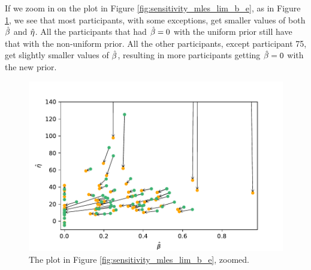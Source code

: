 If we zoom in on the plot in Figure \ref{fig:sensitivity_mles_lim_b_e}, as in Figure \ref{fig:sensitivity_mles_lim_b_e_zoomed}, we see that most participants, with some exceptions, get smaller values of both $\hat{\beta}$ and $\hat{\eta}$. 
All the participants that had $\hat{\beta}=0$ with the uniform prior still have that with the non-uniform prior. %
All the other participants, except participant 75, get slightly smaller values of $\hat{\beta}$, resulting in more participants getting $\hat{\beta}=0$ with the new prior.
\begin{figure}
    \centering
    \includegraphics[scale=0.7]{pictures/Sensitivity/mles_lim_b_e_zoomed.pdf}
    \caption[MLEs of $\beta$ and $\eta$ for prior with $\gamma=\kappa=1$ and $\gamma=\kappa=0.5$, limited, zoomed]{The plot in Figure \ref{fig:sensitivity_mles_lim_b_e}, zoomed.}
    \label{fig:sensitivity_mles_lim_b_e_zoomed}
\end{figure}

